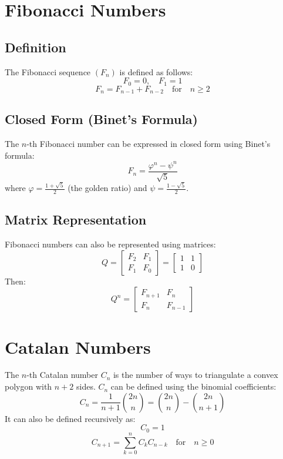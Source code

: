\documentclass{article}
\begin{document}
\section{Fibonacci Numbers}

\subsection{Definition}

The Fibonacci sequence $(F_n)$ is defined as follows:
\begin{equation}
F_0 = 0, \quad F_1 = 1
\end{equation}
\begin{equation}
F_n = F_{n-1} + F_{n-2} \quad \text{for} \quad n \geq 2
\end{equation}

\subsection{Closed Form (Binet's Formula)}

The $n$-th Fibonacci number can be expressed in closed form using Binet's formula:
\begin{equation}
F_n = \frac{\varphi^n - \psi^n}{\sqrt{5}}
\end{equation}
where $\varphi = \frac{1 + \sqrt{5}}{2}$ (the golden ratio) and $\psi = \frac{1 - \sqrt{5}}{2}$.

\subsection{Matrix Representation}

Fibonacci numbers can also be represented using matrices:
\[
Q=\begin{bmatrix}
F_2 & F_1 \\
F_1 & F_0
\end{bmatrix}
= \begin{bmatrix}
1 & 1 \\
1 & 0
\end{bmatrix}
\]
Then:
\[
Q^n=\begin{bmatrix}
F_{n+1} & F_n \\
F_n & F_{n-1}
\end{bmatrix}
\]

\section{Catalan Numbers}

The $n$-th Catalan number $C_n$ is the number of ways to triangulate a convex polygon with $n+2$ sides. $C_n$ can be defined using the binomial coefficients:
\begin{equation}
C_n = \frac{1}{n+1} \binom{2n}{n} = \binom{2n}{n} - \binom{2n}{n+1}
\end{equation}
It can also be defined recursively as:
\begin{equation}
C_0 = 1
\end{equation}
\begin{equation}
C_{n+1} = \sum_{k=0}^{n} C_k C_{n-k} \quad \text{for} \quad n \geq 0
\end{equation}
\end{document}
